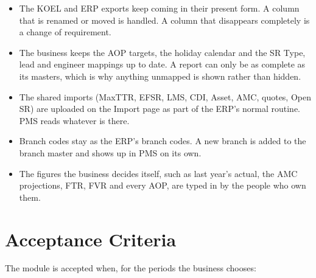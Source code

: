 \documentclass[11pt,a4paper]{article}
\begin{document}
\begin{itemize}
  \item The KOEL and ERP exports keep coming in their present form. A column that is
  renamed or moved is handled. A column that disappears completely is a change of
  requirement.
  \item The business keeps the AOP targets, the holiday calendar and the SR Type, lead and
  engineer mappings up to date. A report can only be as complete as its masters, which is
  why anything unmapped is shown rather than hidden.
  \item The shared imports (MaxTTR, EFSR, LMS, CDI, Asset, AMC, quotes, Open SR) are
  uploaded on the Import page as part of the ERP's normal routine. PMS reads whatever is
  there.
  \item Branch codes stay as the ERP's branch codes. A new branch is added to the branch
  master and shows up in PMS on its own.
  \item The figures the business decides itself, such as last year's actual, the AMC
  projections, FTR, FVR and every AOP, are typed in by the people who own them.
\end{itemize}

\section{Acceptance Criteria}

The module is accepted when, for the periods the business chooses:
\end{document}
